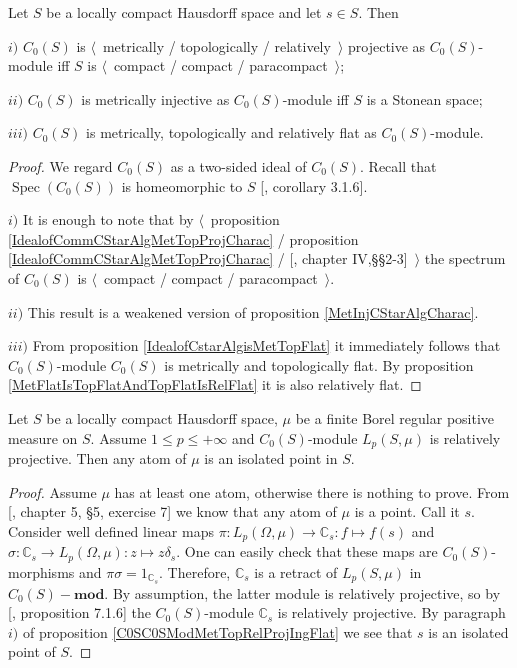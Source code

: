\begin{proposition}\label{C0SC0SModMetTopRelProjIngFlat} Let $S$ be a locally compact Hausdorff space and let $s\in S$. Then

$i)$ $C_0(S)$ is $\langle$~metrically / topologically / relatively~$\rangle$ projective as $C_0(S)$-module iff $S$ is $\langle$~compact / compact / paracompact~$\rangle$;

$ii)$ $C_0(S)$ is metrically injective as $C_0(S)$-module iff $S$ is a Stonean space;

$iii)$ $C_0(S)$ is metrically, topologically and relatively flat as $C_0(S)$-module.
\end{proposition}
\begin{proof} We regard $C_0(S)$ as a two-sided ideal of $C_0(S)$. Recall that $\operatorname{Spec}(C_0(S))$ is homeomorphic to $S$ [\cite{HelHomolBanTopAlg}, corollary 3.1.6].

$i)$ It is enough to note that by $\langle$~proposition \ref{IdealofCommCStarAlgMetTopProjCharac} / proposition \ref{IdealofCommCStarAlgMetTopProjCharac} / [\cite{HelHomolBanTopAlg}, chapter IV,\S\S 2-3]~$\rangle$ the spectrum of $C_0(S)$ is $\langle$~compact / compact / paracompact~$\rangle$. 

$ii)$ This result is a weakened version of proposition \ref{MetInjCStarAlgCharac}.

$iii)$ From proposition \ref{IdealofCstarAlgisMetTopFlat} it immediately follows that $C_0(S)$-module $C_0(S)$ is metrically and topologically flat. By proposition \ref{MetFlatIsTopFlatAndTopFlatIsRelFlat} it is also relatively flat.
\end{proof}

\begin{proposition}\label{AtomsOfRelProjLpMod} Let $S$ be a locally compact Hausdorff space, $\mu$ be a finite Borel regular positive measure on $S$. Assume $1\leq p\leq+\infty$ and $C_0(S)$-module $L_p(S,\mu)$ is relatively projective. Then any atom of $\mu$ is an isolated point in $S$.
\end{proposition} 
\begin{proof} Assume $\mu$ has at least one atom, otherwise there is nothing to prove. From [\cite{BourbElemMathIntegLivVI}, chapter 5, \S 5, exercise 7] we know that any atom of $\mu$ is a point. Call it $s$. Consider well defined linear maps $\pi:L_p(\Omega,\mu)\to\mathbb{C}_s:f\mapsto f(s)$ and $\sigma:\mathbb{C}_s\to L_p(\Omega,\mu):z\mapsto z\delta_s$. One can easily check that these maps are $C_0(S)$-morphisms and $\pi\sigma=1_{\mathbb{C}_s}$. Therefore, $\mathbb{C}_s$ is a retract of $L_p(S,\mu)$ in $C_0(S)-\mathbf{mod}$. By assumption, the latter module is relatively projective, so by [\cite{HelBanLocConvAlg}, proposition 7.1.6] the $C_0(S)$-module $\mathbb{C}_s$ is relatively projective. By paragraph $i)$ of proposition \ref{C0SC0SModMetTopRelProjIngFlat} we see that $s$ is an isolated point of $S$.
\end{proof}

